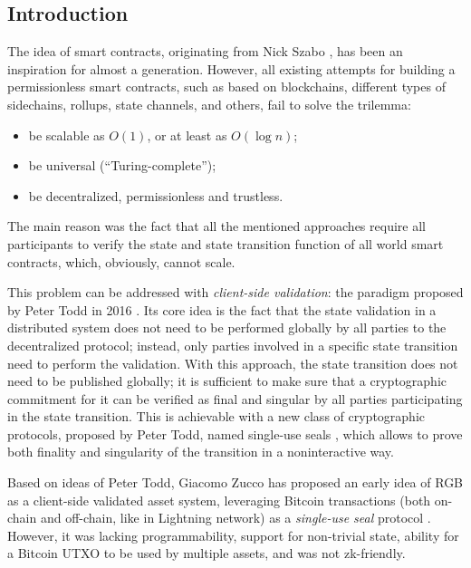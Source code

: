 \documentclass[9pt,oneside]{amsart}
\begin{document}
\thispagestyle{empty}
\setlength{\columnsep}{20pt}
\begin{multicols}{2}

\section{Introduction}

The idea of smart contracts, originating from Nick Szabo \cite{Szabo},
has been an inspiration for almost a generation.
However, all existing attempts for building a permissionless smart contracts,
such as based on blockchains, different types of sidechains,
rollups, state channels, and others, fail to solve the trilemma:
\begin{itemize}
    \item be scalable as $O(1)$, or at least as $O(\log n)$;
    \item be universal (``Turing-complete'');
    \item be decentralized, permissionless and trustless.
\end{itemize}

The main reason was the fact that all the mentioned approaches require
all participants to verify the state and state transition function of all world smart contracts,
which, obviously, cannot scale.

This problem can be addressed with
\emph{client-side validation}: the paradigm proposed by Peter Todd in 2016 \cite{CSV}.
Its core idea is the fact that the state validation in a distributed system
does not need to be performed globally by all parties to the decentralized protocol;
instead, only parties involved in a specific state transition need to perform the validation.
With this approach, the state transition does not need to be published globally;
it is sufficient to make sure that a cryptographic commitment for it
can be verified as final and singular by all parties participating in the state transition.
This is achievable with a new class of cryptographic protocols,
proposed by Peter Todd, named single-use seals \cite{SUS1, SUS2}, which allows
to prove both finality and singularity of the transition in a noninteractive way.

Based on ideas of Peter Todd, Giacomo Zucco has proposed an early idea of RGB as
a client-side validated asset system, leveraging Bitcoin transactions
(both on-chain and off-chain, like in Lightning network) as a \emph{single-use seal} protocol \cite{Zucco}.
However, it was lacking programmability, support for non-trivial state,
ability for a Bitcoin UTXO to be used by multiple assets,
and was not zk-friendly.


\end{multicols}
\end{document}
